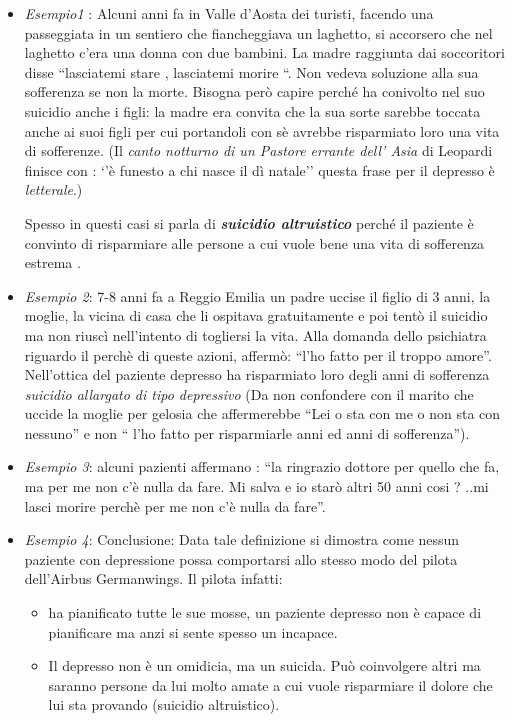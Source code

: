 \begin{itemize}
\item
\emph{Esempio1} : Alcuni anni fa in Valle d'Aosta dei turisti, facendo
una passeggiata in un sentiero che fiancheggiava un laghetto, si
accorsero che nel laghetto c'era una donna con due bambini. La madre
raggiunta dai soccoritori disse ``lasciatemi stare , lasciatemi morire
``. Non vedeva soluzione alla sua sofferenza se non la morte. Bisogna
però capire perché ha conivolto nel suo suicidio anche i figli: la madre
era convita che la sua sorte sarebbe toccata anche ai suoi figli per cui
portandoli con sè avrebbe risparmiato loro una vita di sofferenze. (Il
\emph{canto notturno di un Pastore errante dell' Asia} di Leopardi
finisce con : `'è funesto a chi nasce il dì natale'' questa frase per il
depresso è \emph{letterale}.)

Spesso in questi casi si parla di \textbf{\emph{suicidio altruistico}}
perché il paziente è convinto di risparmiare alle persone a cui vuole
bene una vita di sofferenza estrema .

\item \emph{Esempio 2}: 7-8 anni fa a Reggio Emilia un padre uccise il figlio
di 3 anni, la moglie, la vicina di casa che li ospitava gratuitamente e
poi tentò il suicidio ma non riuscì nell'intento di togliersi la vita.
Alla domanda dello psichiatra riguardo il perchè di queste azioni,
affermò: ``l'ho fatto per il troppo amore''. Nell'ottica del paziente
depresso ha risparmiato loro degli anni di sofferenza \emph{suicidio
allargato di tipo depressivo} (Da non confondere con il marito che
uccide la moglie per gelosia che affermerebbe ``Lei o sta con me o non
sta con nessuno'' e non `` l'ho fatto per risparmiarle anni ed anni di
sofferenza'').

\item \emph{Esempio 3}: alcuni pazienti affermano : ``la ringrazio dottore per
quello che fa, ma per me non c'è nulla da fare. Mi salva e io starò
altri 50 anni cosi ? ..mi lasci morire perchè per me non c'è nulla da
fare''.

\item \emph{Esempio 4}: Conclusione: Data tale definizione si dimostra come
nessun paziente con depressione possa comportarsi allo stesso modo del
pilota dell'Airbus Germanwings. Il pilota infatti:

\begin{itemize}
\item
  ha pianificato tutte le sue mosse, un paziente depresso non è capace
  di pianificare ma anzi si sente spesso un incapace.
\item
  Il depresso non è un omidicia, ma un suicida. Può coinvolgere altri ma
  saranno persone da lui molto amate a cui vuole risparmiare il dolore
  che lui sta provando (suicidio altruistico).
\end{itemize}
\end{itemize}

